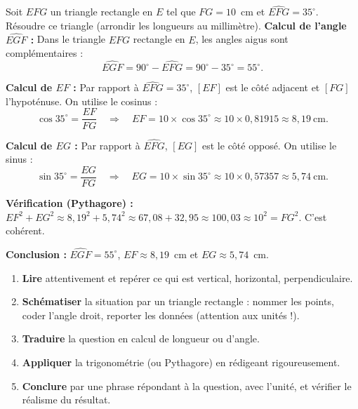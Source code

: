 \documentclass[11pt]{article}
\begin{document}
\begin{exoresolu}
Soit $EFG$ un triangle rectangle en $E$ tel que $FG = 10$~cm et $\widehat{EFG} = 35^{\circ}$. Résoudre ce triangle (arrondir les longueurs au millimètre).
\tcblower
\textbf{Calcul de l'angle $\widehat{EGF}$ :} Dans le triangle $EFG$ rectangle en $E$, les angles aigus sont complémentaires :
\[ \widehat{EGF} = 90^{\circ} - \widehat{EFG} = 90^{\circ} - 35^{\circ} = 55^{\circ}. \]

\textbf{Calcul de $EF$ :} Par rapport à $\widehat{EFG} = 35^{\circ}$, $[EF]$ est le côté adjacent et $[FG]$ l'hypoténuse. On utilise le cosinus :
\[ \cos 35^{\circ} = \dfrac{EF}{FG} \quad \Rightarrow \quad EF = 10 \times \cos 35^{\circ} \approx 10 \times 0{,}81915 \approx 8{,}19~\text{cm}. \]

\textbf{Calcul de $EG$ :} Par rapport à $\widehat{EFG}$, $[EG]$ est le côté opposé. On utilise le sinus :
\[ \sin 35^{\circ} = \dfrac{EG}{FG} \quad \Rightarrow \quad EG = 10 \times \sin 35^{\circ} \approx 10 \times 0{,}57357 \approx 5{,}74~\text{cm}. \]

\textbf{Vérification (Pythagore) :} $EF^2 + EG^2 \approx 8{,}19^2 + 5{,}74^2 \approx 67{,}08 + 32{,}95 \approx 100{,}03 \approx 10^2 = FG^2$. C'est cohérent.

\textbf{Conclusion :} $\widehat{EGF} = 55^{\circ}$, $EF \approx 8{,}19$~cm et $EG \approx 5{,}74$~cm.
\end{exoresolu}

\begin{methode}
\begin{enumerate}
\item \textbf{Lire} attentivement et repérer ce qui est vertical, horizontal, perpendiculaire.
\item \textbf{Schématiser} la situation par un triangle rectangle : nommer les points, coder l'angle droit, reporter les données (attention aux unités !).
\item \textbf{Traduire} la question en calcul de longueur ou d'angle.
\item \textbf{Appliquer} la trigonométrie (ou Pythagore) en rédigeant rigoureusement.
\item \textbf{Conclure} par une phrase répondant à la question, avec l'unité, et vérifier le réalisme du résultat.
\end{enumerate}
\end{methode}
\end{document}
